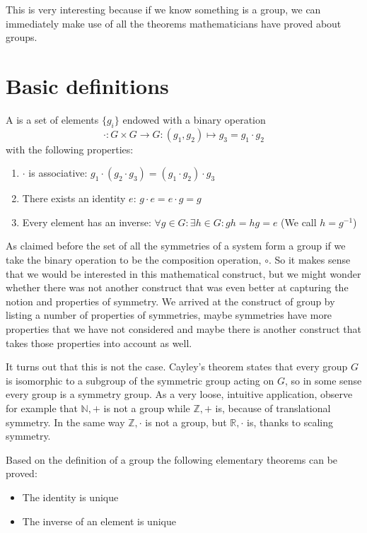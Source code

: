 This is very interesting because if we know something is a group, we can immediately make use of all the theorems mathematicians have proved about groups.

\section{Basic definitions}

\begin{definition}
A  is a set of elements $\{g_i\}$ endowed with a binary operation
\[ \boldsymbol{\cdot} : G\times G \rightarrow G: (g_1, g_2) \mapsto g_3 = g_1\cdot g_2\]
with the following properties:
\begin{enumerate}
\item $\cdot$ is associative: $g_1\cdot (g_2\cdot g_3) = (g_1\cdot g_2)\cdot g_3$
\item There exists an identity $e$: $g\cdot e = e\cdot g = g$
\item Every element has an  inverse: $\forall g\in G: \exists h \in G: gh = hg = e$ (We call $h = g^{-1}$) 
\end{enumerate}
\end{definition}
As claimed before the set of all the symmetries of a system form a group if we take the binary operation to be the composition operation, $\circ$. So it makes sense that we would be interested in this mathematical construct, but we might wonder whether there was not another construct that was even better at capturing the notion and properties of symmetry. We arrived at the construct of group by listing a number of properties of symmetries, maybe symmetries have more properties that we have not considered and maybe there is another construct that takes those properties into account as well.

It turns out that this is not the case. Cayley's theorem states that every group $G$ is isomorphic to a subgroup of the symmetric group acting on $G$, so in some sense every group is a symmetry group. As a very loose, intuitive application, observe for example that $\mathbb{N},+$ is not a group while $\mathbb{Z},+$ is, because of translational symmetry. In the same way $\mathbb{Z},\cdot$ is not a group, but $\mathbb{R},\cdot$ is, thanks to scaling symmetry.

Based on the definition of a group the following elementary theorems can be proved:
\begin{eigenschap}
\begin{itemize}
\item The identity is unique
\item The inverse of an element is unique
\end{itemize}
\end{eigenschap}

